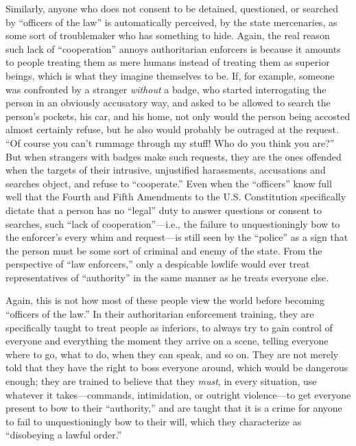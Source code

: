 \documentclass{book}
\begin{document}
Similarly, anyone who does not consent to be detained, questioned, or searched by \enquote{officers of the law} is automatically perceived, by the state mercenaries, as some sort of troublemaker who has something to hide. Again, the real reason such lack of \enquote{cooperation} annoys authoritarian enforcers is because it amounts to people treating them as mere humans instead of treating them as superior beings, which is what they imagine themselves to be. If, for example, someone was confronted by a stranger \emph{without} a badge, who started interrogating the person in an obviously accusatory way, and asked to be allowed to search the person's pockets, his car, and his home, not only would the person being accosted almost certainly refuse, but he also would probably be outraged at the request. \enquote{Of course you can't rummage through my stuff! Who do you think you are?} But when strangers with badges make such requests, they are the ones offended when the targets of their intrusive, unjustified harassments, accusations and searches object, and refuse to \enquote{cooperate.} Even when the \enquote{officers} know full well that the Fourth and Fifth Amendments to the U.S. Constitution specifically dictate that a person has no \enquote{legal} duty to answer questions or consent to searches, such \enquote{lack of cooperation}---i.e., the failure to unquestioningly bow to the enforcer's every whim and request---is still seen by the \enquote{police} as a sign that the person must be some sort of criminal and enemy of the state. From the perspective of \enquote{law enforcers,} only a despicable lowlife would ever treat representatives of \enquote{authority} in the same manner as he treats everyone else.

Again, this is not how most of these people view the world before becoming \enquote{officers of the law.} In their authoritarian enforcement training, they are specifically taught to treat people as inferiors, to always try to gain control of everyone and everything the moment they arrive on a scene, telling everyone where to go, what to do, when they can speak, and so on. They are not merely told that they have the right to boss everyone around, which would be dangerous enough; they are trained to believe that they \emph{must}, in every situation, use whatever it takes---commands, intimidation, or outright violence---to get everyone present to bow to their \enquote{authority,} and are taught that it is a crime for anyone to fail to unquestioningly bow to their will, which they characterize as \enquote{disobeying a lawful order.}
\end{document}
